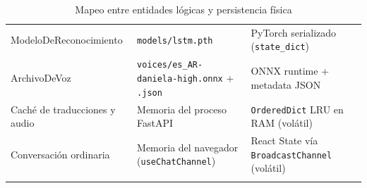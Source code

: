 \begin{longtable}{>{\raggedright\arraybackslash}p{4.0cm} >{\raggedright\arraybackslash}p{4.8cm} >{\raggedright\arraybackslash}p{5.0cm}}
    ModeloDeReconocimiento &
    \texttt{models/\allowbreak lstm.pth} &
    PyTorch serializado (\texttt{state\_dict}) \\

    ArchivoDeVoz &
    \texttt{voices/es\_AR-daniela-high.onnx} + \texttt{.json} &
    ONNX runtime + metadata JSON \\

    Caché de traducciones y audio &
    Memoria del proceso FastAPI &
    \texttt{OrderedDict} LRU en RAM (volátil) \\

    Conversación ordinaria &
    Memoria del navegador (\texttt{useChatChannel}) &
    React State vía \texttt{BroadcastChannel} (volátil) \\
    \bottomrule
    \caption{Mapeo entre entidades lógicas y persistencia física}
    \label{tab:dat-mapeo-fisico}
\end{longtable}

